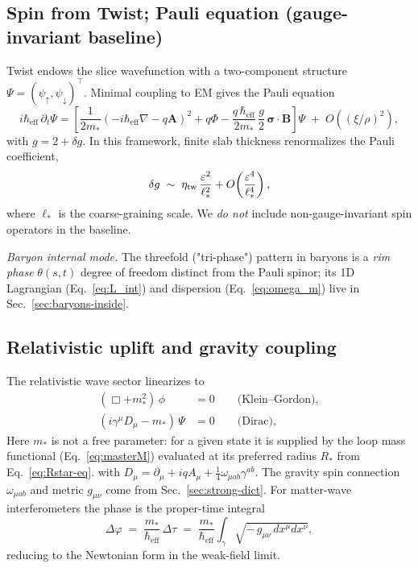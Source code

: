 \subsection{Spin from Twist; Pauli equation (gauge-invariant baseline)}
\label{sec:QM_spin}

Twist endows the slice wavefunction with a two-component structure \(\Psi=(\psi_\uparrow,\psi_\downarrow)^\top\). Minimal coupling to EM gives the Pauli equation
\begin{equation}
i\hbar_{\mathrm{eff}}\,\partial_t \Psi
= \left[\frac{1}{2m_*}\!\left(-i\hbar_{\mathrm{eff}}\nabla - q\mathbf{A}\right)^2 + q\Phi - \frac{q\,\hbar_{\mathrm{eff}}}{2m_*}\,\frac{g}{2}\,\boldsymbol{\sigma}\!\cdot\!\mathbf{B} \right]\Psi
\;+\; O\!\left((\xi/\rho)^2\right),
\label{eq:pauli}
\end{equation}
with \(g=2+\delta g\). In this framework, finite slab thickness renormalizes the Pauli coefficient,
\[
\delta g \;\sim\; \eta_{\rm tw}\,\frac{\varepsilon^2}{\ell_*^2} + O\!\left(\frac{\varepsilon^4}{\ell_*^4}\right),
\]
where \(\ell_*\) is the coarse-graining scale. We \emph{do not} include non-gauge-invariant spin operators in the baseline.

\noindent\emph{Baryon internal mode.} The threefold ("tri-phase") pattern in baryons is a \emph{rim phase} \(\theta(s,t)\) degree of freedom distinct from the Pauli spinor; its 1D Lagrangian (Eq.~\eqref{eq:L_int}) and dispersion (Eq.~\eqref{eq:omega_m}) live in Sec.~\ref{sec:baryons-inside}.

\subsection{Relativistic uplift and gravity coupling}
\label{sec:QM_relativistic}

The relativistic wave sector linearizes to
\begin{align}
(\Box + m_*^2)\,\phi &= 0 \qquad \text{(Klein--Gordon)}, 
\label{eq:kg}\\
(i\gamma^\mu D_\mu - m_*)\,\Psi &= 0 \qquad \text{(Dirac)},
\label{eq:dirac}
\end{align}
Here \(m_*\) is not a free parameter: for a given state it is supplied by the loop mass functional (Eq.~\eqref{eq:masterM}) evaluated at its preferred radius \(R_\ast\) from Eq.~\eqref{eq:Rstar-eq}.
with \(D_\mu=\partial_\mu + iqA_\mu + \tfrac{1}{4}\omega_{\mu ab}\gamma^{ab}\). The gravity spin connection \(\omega_{\mu ab}\) and metric \(g_{\mu\nu}\) come from Sec.~\ref{sec:strong-dict}. For matter-wave interferometers the phase is the proper-time integral
\begin{equation}
\Delta \varphi \;=\; \frac{m_*}{\hbar_{\mathrm{eff}}}\,\Delta \tau \;=\; \frac{m_*}{\hbar_{\mathrm{eff}}}\int_\gamma \!\sqrt{-\,g_{\mu\nu}\,dx^\mu dx^\nu},
\label{eq:grav-phase}
\end{equation}
reducing to the Newtonian form in the weak-field limit.

